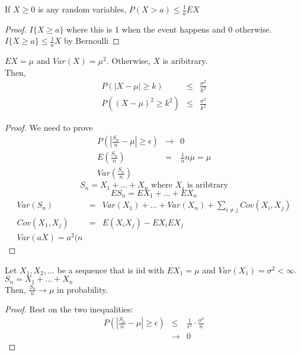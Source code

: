   \begin{theorem}
    If $X \ge 0$ is any random variables, $P(X > a) \le \frac{1}{a}EX$
  \end{theorem}
  \begin{proof}
    $I\{X \ge a\}$ where this is 1 when the event happens and 0 otherwise.
    $I\{X \ge a\} \le \frac{1}{a}X$ by Bernoulli
  \end{proof}
  \begin{theorem}
    $EX = \mu$ and $Var(X) = \mu^2$. Otherwise, $X$ is aribitrary.\\
    Then, 
    \begin{eqnarray*}
      P(|X - \mu| \ge k) & \le & \frac{\sigma^2}{k^2}\\
      P((X - \mu)^2 \ge k^2)& \le & \frac{\sigma^2}{k^2}
    \end{eqnarray*}
  \end{theorem}
  \begin{proof}
    We need to prove
    \begin{eqnarray*}
      P\left(\left|\frac{S_n}{n} - \mu\right|\ge \epsilon\right) & \to & 0\\
      E\left(\frac{S_n}{n}\right) & = & \frac{1}{n} n\mu = \mu\\
      Var\left(\frac{S_n}{n}\right)
    \end{eqnarray*}
    $$
      S_n = X_1 + \ldots + X_n \text{ where $X_i$ is aribtrary}
    $$ 
    $$
      ES_n = EX_1 + \ldots + EX_n
    $$
    \begin{eqnarray*}
      Var(S_n) & = & Var(X_1) + \ldots + Var(X_n) + \sum_{i \not= j}Cov(X_i, X_j)\\
      Cov(X_1, X_j) & = & E(X_iX_j) - EX_i EX_j\\
      Var(aX) = a^2(n
    \end{eqnarray*}
  \end{proof}
  \begin{theorem}
    Let $X_1, X_2, \ldots$ be a sequence that is iid with $EX_1 = \mu$ and
    $Var(X_1) = \sigma^2 < \infty$.\\
    $S_n = X_1 + \ldots + X_n$\\
    Then, $\frac{S_n}{n} \to \mu$ in probability.
  \end{theorem}
  \begin{proof}
    Rest on the two inequalities:
    \begin{eqnarray*}
      P\left(\left|\frac{S_n}{n} - \mu\right| \ge \epsilon\right) 
      & \le & \frac{1}{\epsilon^2}\cdot \frac{\sigma^2}{n}\\
      & \to & 0
    \end{eqnarray*}
  \end{proof}
